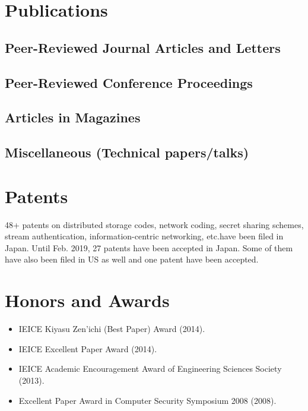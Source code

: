 \section*{Publications}

\subsection*{Peer-Reviewed Journal Articles and Letters}



\subsection*{Peer-Reviewed Conference Proceedings}


\subsection*{Articles in Magazines}


\subsection*{Miscellaneous (Technical papers/talks)}



\section*{Patents}
48+ patents on distributed storage codes, network coding, secret sharing schemes, stream authentication, information-centric networking, etc.\@ have been filed in Japan. Until Feb. 2019, 27 patents have been accepted in Japan. Some of them have also been filed in US as well and one patent have been accepted.



\section*{Honors and Awards}
\begin{itemize}
\item IEICE Kiyasu Zen'ichi (Best Paper) Award (2014).
\item IEICE Excellent Paper Award (2014).
\item IEICE Academic Encouragement Award of Engineering Sciences Society (2013).
\item Excellent Paper Award in Computer Security Symposium 2008 (2008).
\end{itemize}


